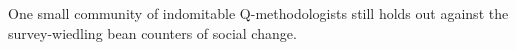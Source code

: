 One small community of indomitable Q-methodologists still holds out against the survey-wiedling bean counters of social change.